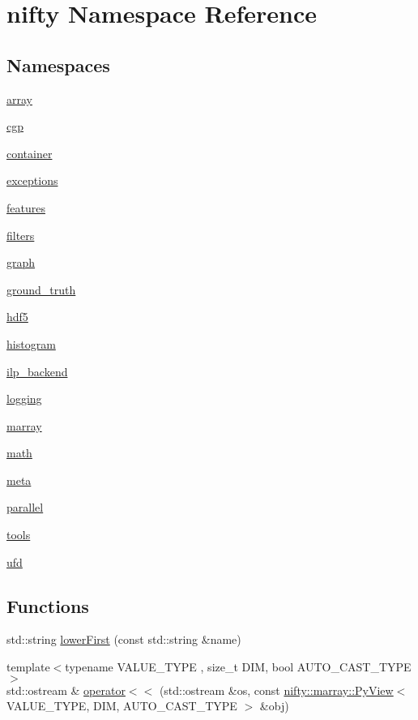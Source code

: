 \hypertarget{namespacenifty}{}\section{nifty Namespace Reference}
\label{namespacenifty}
\subsection*{Namespaces}
\begin{DoxyCompactItemize}
\item 
 \hyperlink{namespacenifty_1_1array}{array}
\item 
 \hyperlink{namespacenifty_1_1cgp}{cgp}
\item 
 \hyperlink{namespacenifty_1_1container}{container}
\item 
 \hyperlink{namespacenifty_1_1exceptions}{exceptions}
\item 
 \hyperlink{namespacenifty_1_1features}{features}
\item 
 \hyperlink{namespacenifty_1_1filters}{filters}
\item 
 \hyperlink{namespacenifty_1_1graph}{graph}
\item 
 \hyperlink{namespacenifty_1_1ground__truth}{ground\+\_\+truth}
\item 
 \hyperlink{namespacenifty_1_1hdf5}{hdf5}
\item 
 \hyperlink{namespacenifty_1_1histogram}{histogram}
\item 
 \hyperlink{namespacenifty_1_1ilp__backend}{ilp\+\_\+backend}
\item 
 \hyperlink{namespacenifty_1_1logging}{logging}
\item 
 \hyperlink{namespacenifty_1_1marray}{marray}
\item 
 \hyperlink{namespacenifty_1_1math}{math}
\item 
 \hyperlink{namespacenifty_1_1meta}{meta}
\item 
 \hyperlink{namespacenifty_1_1parallel}{parallel}
\item 
 \hyperlink{namespacenifty_1_1tools}{tools}
\item 
 \hyperlink{namespacenifty_1_1ufd}{ufd}
\end{DoxyCompactItemize}
\subsection*{Functions}
\begin{DoxyCompactItemize}
\item 
std\+::string \hyperlink{namespacenifty_af89b6a59b4fc8d4224d6a73f745d52f9}{lower\+First} (const std\+::string \&name)
\item 
{\footnotesize template$<$typename V\+A\+L\+U\+E\+\_\+\+T\+Y\+P\+E , size\+\_\+t D\+I\+M, bool A\+U\+T\+O\+\_\+\+C\+A\+S\+T\+\_\+\+T\+Y\+P\+E$>$ }\\std\+::ostream \& \hyperlink{namespacenifty_a0b15288d0f31e0356269a1af3a12de5f}{operator$<$$<$} (std\+::ostream \&os, const \hyperlink{classnifty_1_1marray_1_1PyView}{nifty\+::marray\+::\+Py\+View}$<$ V\+A\+L\+U\+E\+\_\+\+T\+Y\+P\+E, D\+I\+M, A\+U\+T\+O\+\_\+\+C\+A\+S\+T\+\_\+\+T\+Y\+P\+E $>$ \&obj)
\end{DoxyCompactItemize}


